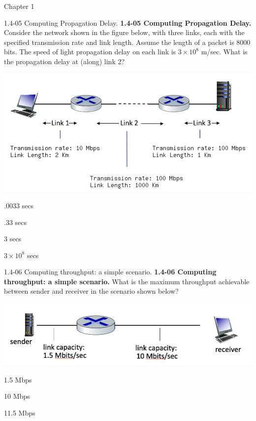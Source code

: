 \documentclass[a4paper]{article}
\begin{document}
\begin{quiz}{Chapter 1}
\begin{multi}[points=1,shuffle=true]{1.4-05 Computing Propagation Delay.}
\textbf{1.4-05 Computing Propagation Delay.} 
Consider the network shown in the figure below, with three links, each with the specified transmission rate and link length. Assume the length of a packet is 8000 bits. The speed of light propagation delay on each link is $3\times10^8$ m/sec.
What is the propagation delay at (along) link 2? 
\begin{center}
\includegraphics[width=.9\linewidth]{figs/1.4.4.png}
\end{center}

\item* .0033 secs
\item .33 secs
\item 3 secs
\item $3\times10^8$ secs
\end{multi}

\begin{multi}[points=1,shuffle=true]{1.4-06 Computing throughput: a simple scenario.}
\textbf{1.4-06 Computing throughput: a simple scenario.} 
What is the maximum throughput achievable between sender and receiver in the scenario shown below? 
\begin{center}
\includegraphics[width=.9\linewidth]{figs/1.4.6.jpg}
\end{center}
%  
\item* 1.5 Mbps
\item 10 Mbps
\item 11.5 Mbps
\end{multi}


\end{quiz}
\end{document}
